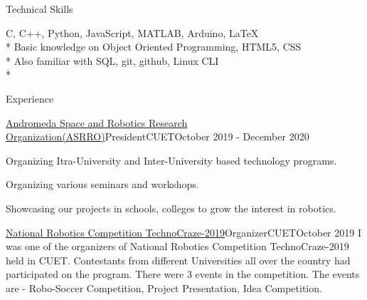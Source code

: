 \documentclass{article}
\newlength{\tabin}
\newlength{\secsep}
\newcommand{\lineunder}{\vspace*{-8pt} \\ \hspace*{-6pt} \hrulefill \\ \vspace*{-15pt}}
\newenvironment{tabbedsection}[1]{
  \begin{list}{}{
      \setlength{\itemsep}{0pt}
      \setlength{\labelsep}{0pt}
      \setlength{\labelwidth}{0pt}
      \setlength{\leftmargin}{\tabin}
      \setlength{\rightmargin}{\tabin}
      \setlength{\listparindent}{0pt}
      \setlength{\parsep}{0pt}
      \setlength{\parskip}{0pt}
      \setlength{\partopsep}{0pt}
      \setlength{\topsep}{#1}
    }
  \item[]
}{\end{list}}
\newenvironment{nospacetabbing}{
    \begin{tabbing}
}{\end{tabbing}\vspace{-1.2em}}
\newenvironment{resume_section}[1]{
  \filbreak
  \vspace{2\secsep}
  \textsc{\large#1}
  \lineunder
  \begin{tabbedsection}{\secsep}
}{\end{tabbedsection}}
\newenvironment{subitems}{
  \renewcommand{\labelitemi}{-}
  \begin{itemize}
      \setlength{\labelsep}{1em}
}{\end{itemize}}
\newenvironment{resume_employer}[4]{
  \vspace{\secsep}
  \textbf{#1} \\ 
  \indent {\small #2} \hfill {\footnotesize#3 (#4)}
  \begin{tabbedsection}{0pt}
  \begin{subitems}
}{\end{subitems}\end{tabbedsection}}
\begin{document}


\begin{resume_section}{Technical Skills}
  \begin{nospacetabbing}
  C, C++, Python, JavaScript, MATLAB, Arduino, \LaTeX\\*
  Basic knowledge on Object Oriented Programming, HTML5, CSS\\*
  Also familiar with SQL, git, github, Linux CLI\\*
  \end{nospacetabbing}
\end{resume_section}%


\begin{resume_section}{Experience}
  \begin{resume_employer}{\href{https://www.facebook.com/asrro2012}{Andromeda Space and Robotics Research Organization(ASRRO)}}{President}{CUET}{October 2019 - December 2020}
    \item Organizing Itra-University and Inter-University based technology programs.
    \item Organizing various seminars and workshops.
    \item Showcasing our projects in schools, colleges to grow the interest in robotics.
  \end{resume_employer}
  
  \begin{resume_employer}{\href{https://www.facebook.com/events/427136194566771}{National Robotics Competition TechnoCraze-2019}}{Organizer}{CUET}{October 2019}
    I was one of the organizers of National Robotics Competition TechnoCraze-2019 held in CUET. Contestants from different Universities all over the country had participated on the program. There were 3 events in the competition. The events are - Robo-Soccer Competition, Project Presentation, Idea Competition.
  \end{resume_employer}
\end{resume_section}%


\end{document}
